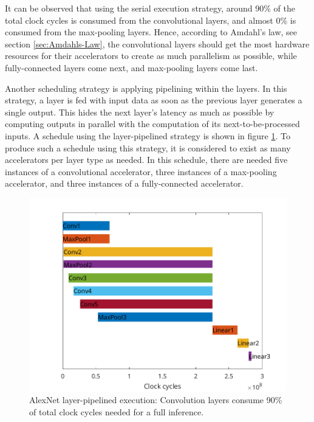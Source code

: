 It can be observed that using the serial execution strategy, around 90\% of the total clock cycles is consumed from the convolutional layers, and almost 0\% is consumed from the max-pooling layers. Hence, according to Amdahl's law, see section \ref{sec:Amdahls-Law}, the convolutional layers should get the most hardware resources for their accelerators to create as much parallelism as possible, while fully-connected layers come next, and max-pooling layers come last.

Another scheduling strategy is applying pipelining within the layers. In this strategy, a layer is fed with input data as soon as the previous layer generates a single output. This hides the next layer's latency as much as possible by computing outputs in parallel with the computation of its next-to-be-processed inputs. A schedule using the layer-pipelined strategy is shown in figure \ref{fig:layer-pipelined-execution}. To produce such a schedule using this strategy, it is considered to exist as many accelerators per layer type as needed. In this schedule, there are needed five instances of a convolutional accelerator,  three instances of a max-pooling accelerator, and three instances of a fully-connected accelerator.

\begin{figure} [H]
	\centering
	\includegraphics[width=\textwidth]{Images/Scheduling/Pipelined-1x.png}
	\decoRule
	\caption[AlexNet layer-pipelined execution]{AlexNet layer-pipelined execution: Convolution layers consume 90\% of total clock cycles needed for a full inference.}
	\label{fig:layer-pipelined-execution}
\end{figure}

